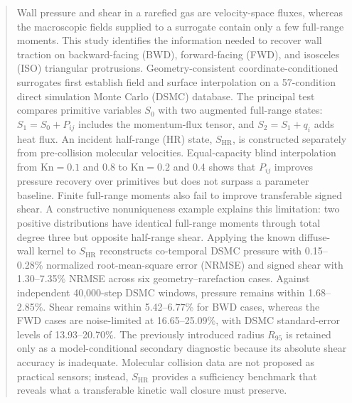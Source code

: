 \documentclass[aip,pof,preprint,notitlepage,floatfix,amsmath,amssymb]{revtex4-2}
\newcommand{\Kn}{\mathrm{Kn}}
\begin{document}
\begin{abstract}
\fontsize{10}{11.2}\selectfont
Wall pressure and shear in a rarefied gas are velocity-space fluxes, whereas the macroscopic fields supplied to a surrogate contain only a few full-range moments. This study identifies the information needed to recover wall traction on backward-facing (BWD), forward-facing (FWD), and isosceles (ISO) triangular protrusions. Geometry-consistent coordinate-conditioned surrogates first establish field and surface interpolation on a 57-condition direct simulation Monte Carlo (DSMC) database. The principal test compares primitive variables $S_0$ with two augmented full-range states: $S_1=S_0+P_{ij}$ includes the momentum-flux tensor, and $S_2=S_1+q_i$ adds heat flux. An incident half-range (HR) state, $S_{\mathrm{HR}}$, is constructed separately from pre-collision molecular velocities. Equal-capacity blind interpolation from $\Kn=0.1$ and 0.8 to $\Kn=0.2$ and 0.4 shows that $P_{ij}$ improves pressure recovery over primitives but does not surpass a parameter baseline. Finite full-range moments also fail to improve transferable signed shear. A constructive nonuniqueness example explains this limitation: two positive distributions have identical full-range moments through total degree three but opposite half-range shear. Applying the known diffuse-wall kernel to $S_{\mathrm{HR}}$ reconstructs co-temporal DSMC pressure with 0.15--0.28\% normalized root-mean-square error (NRMSE) and signed shear with 1.30--7.35\% NRMSE across six geometry--rarefaction cases. Against independent 40,000-step DSMC windows, pressure remains within 1.68--2.85\%. Shear remains within 5.42--6.77\% for BWD cases, whereas the FWD cases are noise-limited at 16.65--25.09\%, with DSMC standard-error levels of 13.93--20.70\%. The previously introduced radius $R_{95}$ is retained only as a model-conditional secondary diagnostic because its absolute shear accuracy is inadequate. Molecular collision data are not proposed as practical sensors; instead, $S_{\mathrm{HR}}$ provides a sufficiency benchmark that reveals what a transferable kinetic wall closure must preserve.
\end{abstract}


\makeatletter\@booleanfalse\preprintsty@sw\makeatother
\maketitle
\makeatletter\@booleantrue\preprintsty@sw\makeatother
\end{document}
